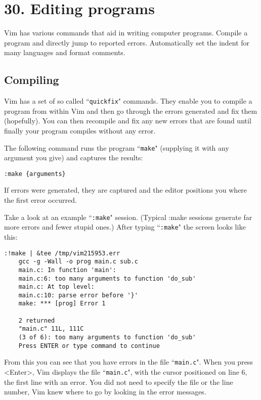 \section{30. Editing programs}
Vim has various commands that aid in writing computer programs.
Compile a program and directly jump to reported errors.
Automatically set the indent for many languages and format comments.
\localtableofcontents
\subsection{Compiling}
Vim has a set of so called ``\texttt{quickfix}" commands.
They enable you to compile a program from within Vim and then go through the errors generated and fix them (hopefully).
You can then recompile and fix any new errors that are found until finally your program compiles without any error.

The following command runs the program ``\texttt{make}" (supplying it with any argument you give) and captures the results:

\begin{Verbatim}[samepage=true]
 :make {arguments}
\end{Verbatim}

If errors were generated, they are captured and the editor positions you where the first error occurred.

Take a look at an example ``\texttt{:make}" session.
(Typical :make sessions generate far more errors and fewer stupid ones.)  After typing ``\texttt{:make}" the screen looks like this:

\begin{Verbatim}[samepage=true]
    :!make | &tee /tmp/vim215953.err
    gcc -g -Wall -o prog main.c sub.c
    main.c: In function 'main':
    main.c:6: too many arguments to function 'do_sub'
    main.c: At top level:
    main.c:10: parse error before '}'
    make: *** [prog] Error 1

    2 returned
    "main.c" 11L, 111C
    (3 of 6): too many arguments to function 'do_sub'
    Press ENTER or type command to continue
\end{Verbatim}

From this you can see that you have errors in the file ``\texttt{main.c}".
When you press <Enter>, Vim displays the file ``\texttt{main.c}", with the cursor positioned on line 6, the first line with an error.
You did not need to specify the file or the line number, Vim knew where to go by looking in the error messages.

